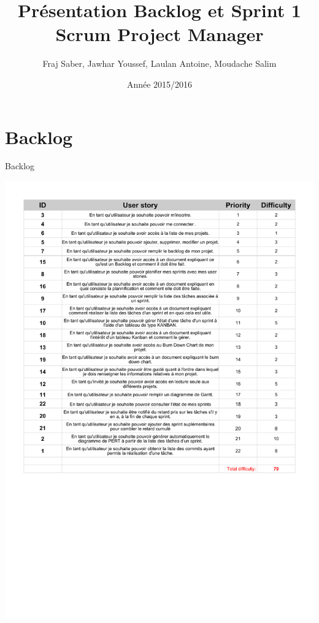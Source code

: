 \documentclass{beamer}
\title{}
\title{Présentation Backlog et Sprint 1 \\ Scrum Project Manager}
\author{Fraj Saber, Jawhar Youssef, Laulan Antoine, Moudache Salim}
\institute{Université de Bordeaux}
\date{Année 2015/2016}
\begin{document}


\begin{frame}
    \titlepage
\end{frame}



\section{Backlog}

\begin{frame}{Backlog}
	\begin{center}
        \includegraphics[scale=0.35]{BacklogPriority.pdf}
        \end{center}
\end{frame}
\end{document}
